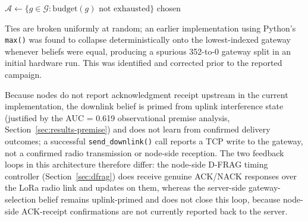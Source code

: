 \documentclass[journal]{IEEEtran}
\begin{document}
\begin{algorithm}[!t]
\caption{Server-Side State-Aware Downlink Scheduling}
\label{alg:scheduler}
\SetAlgoLined
{}
$\mathcal{A} \leftarrow \{g \in \mathcal{G} : \text{budget}(g) \text{ not exhausted}\}$\;
\Return chosen\;
\end{algorithm}

Ties are broken uniformly at random; an earlier implementation using Python's \texttt{max()} was found to collapse deterministically onto the lowest-indexed gateway whenever beliefs were equal, producing a spurious 352-to-0 gateway split in an initial hardware run. This was identified and corrected prior to the reported campaign.

Because nodes do not report acknowledgment receipt upstream in the current implementation, the downlink belief is primed from uplink interference state (justified by the AUC = 0.619 observational premise analysis, Section~\ref{sec:results-premise}) and does not learn from confirmed delivery outcomes; a successful \texttt{send\_downlink()} call reports a TCP write to the gateway, not a confirmed radio transmission or node-side reception. The two feedback loops in this architecture therefore differ: the node-side D-FRAG timing controller (Section~\ref{sec:dfrag}) does receive genuine ACK/NACK responses over the LoRa radio link and updates on them, whereas the server-side gateway-selection belief remains uplink-primed and does not close this loop, because node-side ACK-receipt confirmations are not currently reported back to the server.
\end{document}
